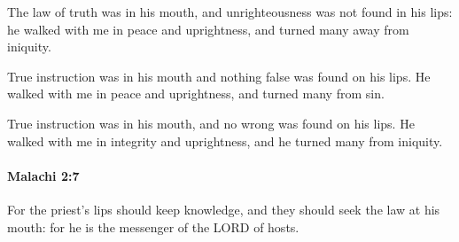 			\begin{versebox}
					\item[BHS] 
					\item[LXX] 
					\item[ASV] The law of truth was in his mouth, and unrighteousness was not found in his lips: he walked with me in peace and uprightness, and turned many away from iniquity.
					\item[NIV] True instruction was in his mouth and nothing false was found on his lips. He walked with me in peace and uprightness, and turned many from sin.
					\item[NRSV] True instruction was in his mouth, and no wrong was found on his lips. He walked with me in integrity and uprightness, and he turned many from iniquity.
			\end{versebox}

		\paragraph{Malachi 2:7} %
			\label{MALACHI-2-7}

			For the priest’s lips should keep knowledge, and they should seek the law at his mouth: for he is the messenger of the LORD of hosts.

